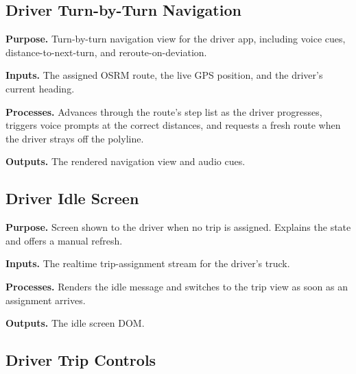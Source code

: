 

\subsection{Driver Turn-by-Turn Navigation}
\label{sec:code_frontend_driver_nav}

\noindent\textbf{Purpose.} Turn-by-turn navigation view for the driver app, including voice cues, distance-to-next-turn, and reroute-on-deviation.

\noindent\textbf{Inputs.} The assigned OSRM route, the live GPS position, and the driver's current heading.

\noindent\textbf{Processes.} Advances through the route's step list as the driver progresses, triggers voice prompts at the correct distances, and requests a fresh route when the driver strays off the polyline.

\noindent\textbf{Outputs.} The rendered navigation view and audio cues.



\subsection{Driver Idle Screen}
\label{sec:code_frontend_driver_notrip}

\noindent\textbf{Purpose.} Screen shown to the driver when no trip is assigned. Explains the state and offers a manual refresh.

\noindent\textbf{Inputs.} The realtime trip-assignment stream for the driver's truck.

\noindent\textbf{Processes.} Renders the idle message and switches to the trip view as soon as an assignment arrives.

\noindent\textbf{Outputs.} The idle screen DOM.



\subsection{Driver Trip Controls}
\label{sec:code_frontend_driver_trip}

